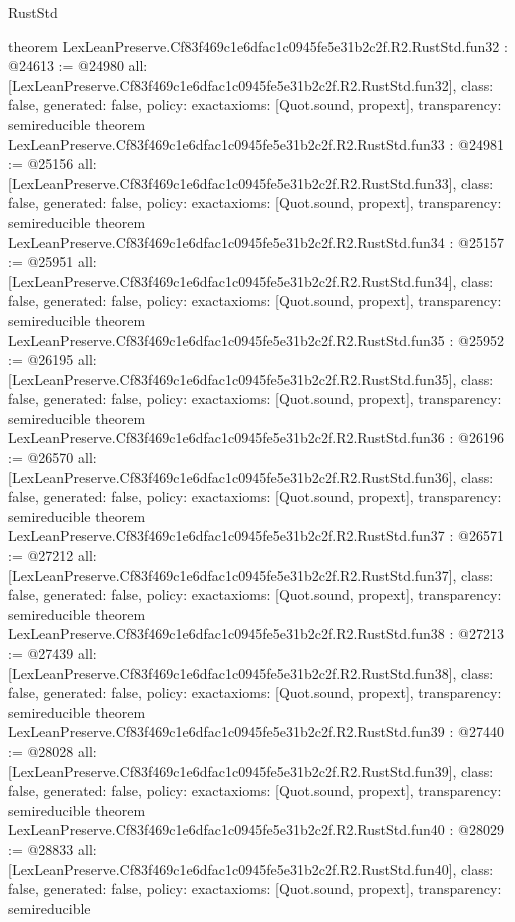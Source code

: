 \begin{lexlean}{RustStd}
\begin{coremodule}
{}
theorem LexLeanPreserve.Cf83f469c1e6dfac1c0945fe5e31b2c2f.R2.RustStd.fun32 : @24613 := @24980 {
  all: [LexLeanPreserve.Cf83f469c1e6dfac1c0945fe5e31b2c2f.R2.RustStd.fun32],
  class: false,
  generated: false,
  policy: exact{axioms: [Quot.sound, propext]},
  transparency: semireducible
}
theorem LexLeanPreserve.Cf83f469c1e6dfac1c0945fe5e31b2c2f.R2.RustStd.fun33 : @24981 := @25156 {
  all: [LexLeanPreserve.Cf83f469c1e6dfac1c0945fe5e31b2c2f.R2.RustStd.fun33],
  class: false,
  generated: false,
  policy: exact{axioms: [Quot.sound, propext]},
  transparency: semireducible
}
theorem LexLeanPreserve.Cf83f469c1e6dfac1c0945fe5e31b2c2f.R2.RustStd.fun34 : @25157 := @25951 {
  all: [LexLeanPreserve.Cf83f469c1e6dfac1c0945fe5e31b2c2f.R2.RustStd.fun34],
  class: false,
  generated: false,
  policy: exact{axioms: [Quot.sound, propext]},
  transparency: semireducible
}
theorem LexLeanPreserve.Cf83f469c1e6dfac1c0945fe5e31b2c2f.R2.RustStd.fun35 : @25952 := @26195 {
  all: [LexLeanPreserve.Cf83f469c1e6dfac1c0945fe5e31b2c2f.R2.RustStd.fun35],
  class: false,
  generated: false,
  policy: exact{axioms: [Quot.sound, propext]},
  transparency: semireducible
}
theorem LexLeanPreserve.Cf83f469c1e6dfac1c0945fe5e31b2c2f.R2.RustStd.fun36 : @26196 := @26570 {
  all: [LexLeanPreserve.Cf83f469c1e6dfac1c0945fe5e31b2c2f.R2.RustStd.fun36],
  class: false,
  generated: false,
  policy: exact{axioms: [Quot.sound, propext]},
  transparency: semireducible
}
theorem LexLeanPreserve.Cf83f469c1e6dfac1c0945fe5e31b2c2f.R2.RustStd.fun37 : @26571 := @27212 {
  all: [LexLeanPreserve.Cf83f469c1e6dfac1c0945fe5e31b2c2f.R2.RustStd.fun37],
  class: false,
  generated: false,
  policy: exact{axioms: [Quot.sound, propext]},
  transparency: semireducible
}
theorem LexLeanPreserve.Cf83f469c1e6dfac1c0945fe5e31b2c2f.R2.RustStd.fun38 : @27213 := @27439 {
  all: [LexLeanPreserve.Cf83f469c1e6dfac1c0945fe5e31b2c2f.R2.RustStd.fun38],
  class: false,
  generated: false,
  policy: exact{axioms: [Quot.sound, propext]},
  transparency: semireducible
}
theorem LexLeanPreserve.Cf83f469c1e6dfac1c0945fe5e31b2c2f.R2.RustStd.fun39 : @27440 := @28028 {
  all: [LexLeanPreserve.Cf83f469c1e6dfac1c0945fe5e31b2c2f.R2.RustStd.fun39],
  class: false,
  generated: false,
  policy: exact{axioms: [Quot.sound, propext]},
  transparency: semireducible
}
theorem LexLeanPreserve.Cf83f469c1e6dfac1c0945fe5e31b2c2f.R2.RustStd.fun40 : @28029 := @28833 {
  all: [LexLeanPreserve.Cf83f469c1e6dfac1c0945fe5e31b2c2f.R2.RustStd.fun40],
  class: false,
  generated: false,
  policy: exact{axioms: [Quot.sound, propext]},
  transparency: semireducible
}
\end{coremodule}
\end{lexlean}
